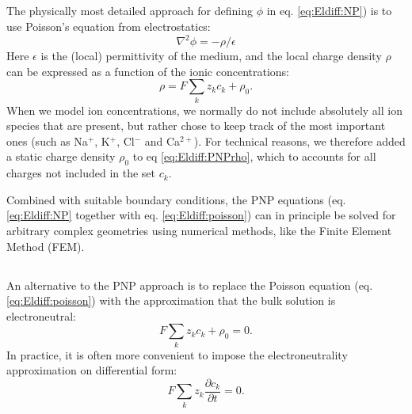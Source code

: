 \subsection{}
\label{sec:Eldiff:PNP}
The physically most detailed approach for defining $\phi$ in eq. \ref{eq:Eldiff:NP}) is to use Poisson's equation from electrostatics:
\begin{equation}
\nabla^2 \phi = -\rho/\epsilon
\label{eq:Eldiff:poisson}
\end{equation}
Here $\epsilon$ is the (local) permittivity of the medium, and the local charge density $\rho$ can be expressed as a function of the ionic concentrations:
\begin{equation}
\rho = F\sum_k z_k c_k + \rho_0.
\label{eq:Eldiff:PNPrho}
\end{equation}
When we model ion concentrations, we normally do not include absolutely all ion species that are present, but rather chose to keep track of the most important ones (such as Na$^+$, K$^+$, Cl$^-$ and Ca$^{2+}$). For technical reasons, we therefore added a static charge density $\rho_0$ to eq \ref{eq:Eldiff:PNPrho}, which to accounts for all charges not included in the set $c_k$. 

Combined with suitable boundary conditions, the PNP equations (eq. \ref{eq:Eldiff:NP} together with eq. \ref{eq:Eldiff:poisson}) can in principle be solved for arbitrary complex geometries using numerical methods, like the Finite Element Method (FEM). 


\subsection{}
\label{sec:Eldiff:electroneutral}
An alternative to the PNP approach is to replace the Poisson equation (eq. \ref{eq:Eldiff:poisson}) with the approximation that the bulk solution is electroneutral:
\begin{equation}
F \sum_k z_k c_k + \rho_0 = 0.
\label{eq:Eldiff:electroneutral}
\end{equation}
In practice, it is often more convenient to impose the electroneutrality approximation on differential form:
\begin{equation}
F \sum_k{z_k \frac{\partial c_k}{\partial t}} = 0.
\label{eq:Eldiff:electroneutral2}
\end{equation}

